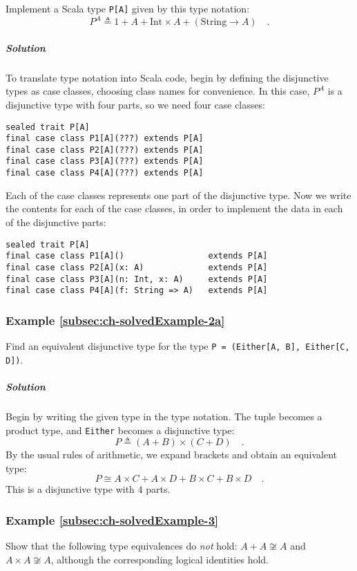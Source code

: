 Implement a Scala type \lstinline!P[A]! given by this type notation:
\[
P^{A}\triangleq1+A+\text{Int}\times A+(\text{String}\rightarrow A)\quad.
\]


\subparagraph{Solution}

To translate type notation into Scala code, begin by defining the
disjunctive types as case classes, choosing class names for convenience.
In this case, $P^{A}$ is a disjunctive type with four parts, so we
need four case classes:
\begin{lstlisting}
sealed trait P[A]
final case class P1[A](???) extends P[A]
final case class P2[A](???) extends P[A]
final case class P3[A](???) extends P[A]
final case class P4[A](???) extends P[A]
\end{lstlisting}
Each of the case classes represents one part of the disjunctive type.
Now we write the contents for each of the case classes, in order to
implement the data in each of the disjunctive parts:
\begin{lstlisting}
sealed trait P[A]
final case class P1[A]()                 extends P[A]
final case class P2[A](x: A)             extends P[A]
final case class P3[A](n: Int, x: A)     extends P[A]
final case class P4[A](f: String => A)   extends P[A]
\end{lstlisting}


\subsubsection{Example \label{subsec:ch-solvedExample-2a}\ref{subsec:ch-solvedExample-2a}}

Find an equivalent disjunctive type for the type \lstinline!P = (Either[A, B], Either[C, D])!.

\subparagraph{Solution}

Begin by writing the given type in the type notation. The tuple becomes
a product type, and \lstinline!Either! becomes a disjunctive type:
\[
P\triangleq(A+B)\times(C+D)\quad.
\]
By the usual rules of arithmetic, we expand brackets and obtain an
equivalent type:
\[
P\cong A\times C+A\times D+B\times C+B\times D\quad.
\]
This is a disjunctive type with $4$ parts.

\subsubsection{Example \label{subsec:ch-solvedExample-3}\ref{subsec:ch-solvedExample-3}}

Show that the following type equivalences do \emph{not} hold: $A+A\not\cong A$
and $A\times A\not\cong A$, although the corresponding logical identities
hold.

